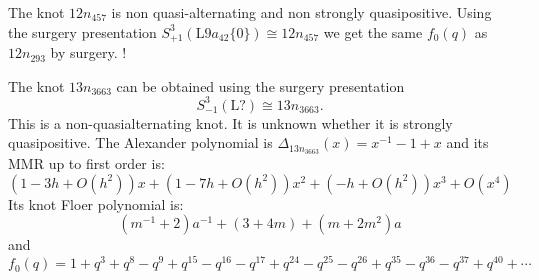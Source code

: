 \documentclass[11pt,e-only]{amsart}
\begin{document}



The knot $12n_{457}$ is non quasi-alternating and non strongly quasipositive. Using the surgery presentation $S^3_{+1}(\mathrm{L}9a_{42}\{0\})\cong 12n_{457}$ we get the same $f_0(q)$ as $12n_{293}$ by surgery. \alert{!}



\begin{example} The knot $13n_{3663}$ can be obtained using the surgery presentation
\begin{equation}
    S^3_{-1}(\mathrm{L}?)\cong 13n_{3663}.
\end{equation}
This is a non-quasialternating knot. It is unknown whether it is strongly quasipositive. The Alexander polynomial is $\Delta_{13n_{3663}}(x)=x^{-1}-1+x$ and its MMR up to first order is:
\begin{equation}
    \left(1-3 h +O(h^2)\right) x+\left(1-7 h+O(h^2)\right) x^2+\left(-h+O(h^2)\right) x^3+O(x^4)
\end{equation}
Its knot Floer polynomial is:
\begin{equation}
    (m^{-1} + 2)a^{-1}+ (3 + 4m)+ (m + 2m^2)a
\end{equation}
and
\begin{equation}
    f_0(q)=1 + q^3 + q^8 - q^9 + q^{15} - q^{16} - q^{17} + q^{24} - q^{25} - q^{26} + q^{35} - q^{36} - q^{37} + q^{40} + \cdots
\end{equation}

\end{example}
\end{document}
